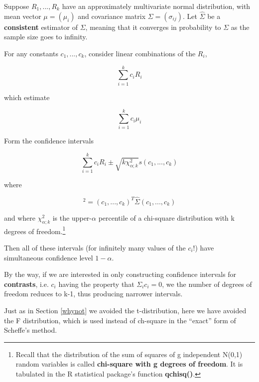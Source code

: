 \begin{theorem}

Suppose $R_1,...,R_k$ have an approximately multivariate normal
distribution, with mean vector $\mu = (\mu_i)$ and covariance matrix
$\Sigma = (\sigma_{ij})$.  Let $\widehat{\Sigma}$ be a {\bf consistent}
estimator of $\Sigma$, meaning that it converges in probability to
$\Sigma$ as the sample size goes to infinity.

For any constants $c_1,...,c_k$, consider linear combinations of the
$R_i$, 

\begin{equation}
\label{lincomb}
\sum_{i=1}^{k} c_i R_i
\end{equation}

which estimate

\begin{equation}
\sum_{i=1}^{k} c_i \mu_i
\end{equation}

Form the confidence intervals 

\begin{equation}
\label{radius}
\sum_{i=1}^{k} c_i R_i \pm 
\sqrt{k \chi_{\alpha; k}^2} s(c_1,...,c_k)
\end{equation}

where

\begin{equation}
[s(c_1,...,c_k)]^2 = (c_1,...,c_k)^T \widehat{\Sigma} (c_1,...,c_k)
\end{equation}

and where $\chi_{\alpha; k}^2$ is the upper-$\alpha$ percentile of a
chi-square distribution with k degrees of freedom.\footnote{Recall
that the distribution of the sum of squares of g independent N(0,1)
random variables is called {\bf chi-square with g degrees of freedom}.
It is tabulated in the R statistical package's function {\bf qchisq()}.}

Then all of these intervals (for infinitely many values of the $c_i$!)
have simultaneous confidence level $1-\alpha$.

\end{theorem}

By the way, if we are interested in only constructing confidence
intervals for {\bf contrasts}, i.e. $c_i$ having the property that
$\Sigma_i c_i = 0$, we the number of degrees of freedom reduces to k-1,
thus producing narrower intervals.

Just as in Section \ref{whynot} we avoided the t-distribution, here we
have avoided the F distribution, which is used instead of ch-square in
the ``exact'' form of Scheffe's method.

